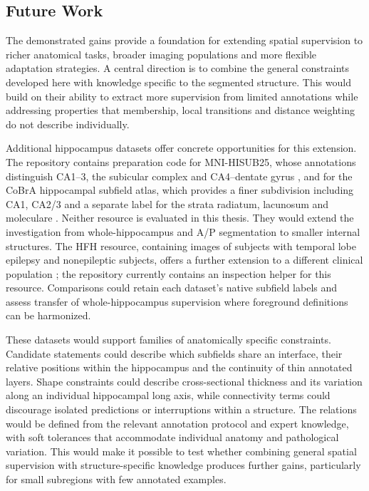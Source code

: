 \documentclass[12pt,a4paper]{article}
\begin{document}
\subsection{Future Work}\label{sec:future-work}
\label{sec:pending-results}

The demonstrated gains provide a foundation for extending spatial
supervision to richer anatomical tasks, broader imaging populations and
more flexible adaptation strategies. A central direction is to combine
the general constraints developed here with knowledge specific to the
segmented structure. This would build on their ability to extract more
supervision from limited annotations while addressing properties that
membership, local transitions and distance weighting do not describe
individually.

Additional hippocampus datasets offer concrete opportunities for this
extension. The repository contains preparation code for MNI-HISUB25,
whose annotations distinguish CA1--3, the subicular complex and CA4--dentate
gyrus \cite{kulaga2015subfields}, and for the CoBrA hippocampal subfield
atlas, which provides a finer subdivision including CA1, CA2/3 and a
separate label for the strata radiatum, lacunosum and moleculare
\cite{winterburn2013atlas}. Neither resource is evaluated in this thesis.
They would extend the investigation from whole-hippocampus and A/P
segmentation to smaller internal structures. The HFH resource, containing
images of subjects with temporal lobe epilepsy and nonepileptic subjects,
offers a further extension to a different clinical population
\cite{jafari2011dataset}; the repository currently contains an inspection
helper for this resource. Comparisons could retain each dataset's native
subfield labels and assess transfer of whole-hippocampus supervision where
foreground definitions can be harmonized.

These datasets would support families of anatomically specific
constraints. Candidate statements could describe which subfields share
an interface, their relative positions within the hippocampus and the
continuity of thin annotated layers. Shape constraints could describe
cross-sectional thickness and its variation along an individual
hippocampal long axis, while connectivity terms could discourage isolated
predictions or interruptions within a structure. The relations would be
defined from the relevant annotation protocol and expert knowledge, with
soft tolerances that accommodate individual anatomy and pathological
variation. This would make it possible to test whether combining general
spatial supervision with structure-specific knowledge produces further
gains, particularly for small subregions with few annotated examples.
\end{document}
